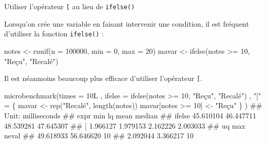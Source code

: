 \documentclass[12pt,ignorenonframetext,handout,]{beamer}
\newenvironment{Shaded}{}{}
\newcommand{\DataTypeTok}[1]{#1}
\newcommand{\DecValTok}[1]{#1}
\newcommand{\KeywordTok}[1]{\textcolor[rgb]{0.00,0.00,1.00}{#1}}
\newcommand{\NormalTok}[1]{#1}
\newcommand{\OperatorTok}[1]{#1}
\newcommand{\StringTok}[1]{\textcolor[rgb]{0.00,0.50,0.50}{#1}}
\renewenvironment{Shaded}{\begin{snugshade}}{\end{snugshade}}
\begin{document}
\begin{frame}[fragile]{Utiliser l’opérateur \texttt{{[}} au lieu de
\texttt{ifelse()}}
\protect\hypertarget{utiliser-loperateur-au-lieu-de-ifelse}{}

\small

Lorsqu’on crée une variable en faisant intervenir une condition, il est
fréquent d’utiliser la fonction \texttt{ifelse()} :

\footnotesize

\begin{Shaded}
\begin{Highlighting}[]
\NormalTok{notes <-}\StringTok{ }\KeywordTok{runif}\NormalTok{(}\DataTypeTok{n =} \DecValTok{100000}\NormalTok{, }\DataTypeTok{min =} \DecValTok{0}\NormalTok{, }\DataTypeTok{max =} \DecValTok{20}\NormalTok{)}
\NormalTok{mavar <-}\StringTok{ }\KeywordTok{ifelse}\NormalTok{(notes }\OperatorTok{>=}\StringTok{ }\DecValTok{10}\NormalTok{, }\StringTok{"Reçu"}\NormalTok{, }\StringTok{"Recalé"}\NormalTok{)}
\end{Highlighting}
\end{Shaded}

\pause \small

Il est néanmoins beaucoup plus efficace d’utiliser l’opérateur
\texttt{{[}}.

\footnotesize

\begin{Shaded}
\begin{Highlighting}[]
\KeywordTok{microbenchmark}\NormalTok{(}\DataTypeTok{times =}\NormalTok{ 10L}
\NormalTok{  , }\DataTypeTok{ifelse =} \KeywordTok{ifelse}\NormalTok{(notes }\OperatorTok{>=}\StringTok{ }\DecValTok{10}\NormalTok{, }\StringTok{"Reçu"}\NormalTok{, }\StringTok{"Recalé"}\NormalTok{)}
\NormalTok{  , }\StringTok{"["}\NormalTok{ =}\StringTok{ }\NormalTok{\{}
\NormalTok{    mavar <-}\StringTok{ }\KeywordTok{rep}\NormalTok{(}\StringTok{"Recalé"}\NormalTok{, }\KeywordTok{length}\NormalTok{(notes))}
\NormalTok{    mavar[notes }\OperatorTok{>=}\StringTok{ }\DecValTok{10}\NormalTok{] <-}\StringTok{ "Reçu"}
\NormalTok{  \} }
\NormalTok{)}
\NormalTok{  ## Unit: milliseconds}
\NormalTok{  ##    expr       min        lq      mean    median}
\NormalTok{  ##  ifelse 45.610104 46.447711 48.539281 47.645307}
\NormalTok{  ##       [  1.966127  1.979153  2.162226  2.003033}
\NormalTok{  ##         uq       max neval}
\NormalTok{  ##  49.618933 56.646620    10}
\NormalTok{  ##   2.092044  3.366217    10}
\end{Highlighting}
\end{Shaded}

\end{frame}
\end{document}
